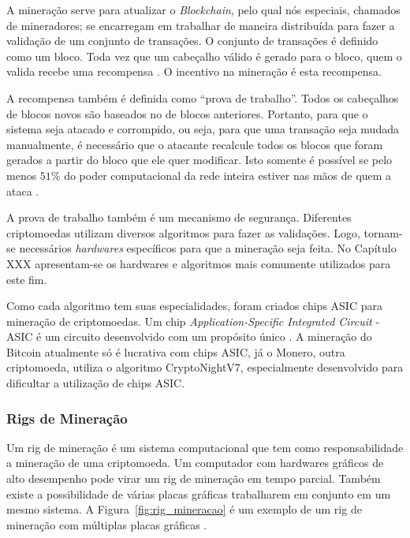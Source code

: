 \documentclass[
article,			%
12pt,				%
openright,			%
oneside,			%
a4paper,			%
chapter=TITLE,		%
section=TITLE,		%
subsection=TITLE,	%
subsubsection=TITLE,%
subsubsubsection=TITLE, %
english,			%
brazil,				%
]{abntex2}
\begin{document}
A mineração serve para atualizar o \emph{Blockchain}, pelo qual nós
especiais, chamados de mineradores; se encarregam em trabalhar de
maneira distribuída para fazer a validação de um conjunto de
transações. O conjunto de transações é definido como um bloco. Toda
vez que um cabeçalho válido é gerado para o bloco, quem o valida
recebe uma recompensa \cite{LChicarino}. O incentivo na mineração é
esta recompensa.

A recompensa também é definida como ``prova de trabalho''. Todos os
cabeçalhos de blocos novos são baseados no de blocos anteriores.
Portanto, para que o sistema seja atacado e corrompido, ou seja, para
que uma transação seja mudada manualmente, é necessário que o atacante
recalcule todos os blocos que foram gerados a partir do bloco que ele
quer modificar. Isto somente é possível se pelo menos $51\%$ do poder
computacional da rede inteira estiver nas mãos de quem a ataca
\cite{Nakamoto2008, Dev2014}.

A prova de trabalho também é um mecanismo de segurança. Diferentes
criptomoedas utilizam diversos algoritmos para fazer as validações.
Logo, tornam-se necessários \emph{hardwares} específicos para que a
mineração seja feita. No Capítulo XXX apresentam-se os hardwares e
algoritmos mais comumente utilizados para este fim.

Como cada algoritmo tem suas especialidades, foram criados chips ASIC
para mineração de criptomoedas. Um chip \emph{Application-Specific
Integrated Circuit} - ASIC é um circuito desenvolvido com um propósito
único \cite{Smith1997}. A mineração do Bitcoin atualmente só é
lucrativa com chips ASIC\@, já o Monero, outra criptomoeda, utiliza o
algoritmo CryptoNightV7, especialmente desenvolvido para dificultar a
utilização de chips ASIC\@ \cite{NiceHash2018}.

\subsubsection{Rigs de Mineração}

Um rig de mineração é um sistema computacional que tem como
responsabilidade a mineração de uma criptomoeda. Um computador com
hardwares gráficos de alto desempenho pode virar um rig de mineração
em tempo parcial. Também existe a possibilidade de várias placas
gráficas trabalharem em conjunto em um mesmo sistema. A
Figura~\ref{fig:rig_mineracao} é um exemplo de um rig de mineração com
múltiplas placas gráficas \cite{BitcoinWiki2015}.
\end{document}
